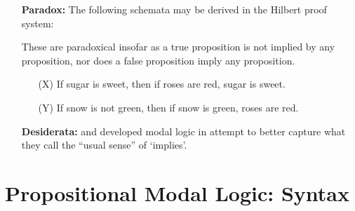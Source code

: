 \documentclass[a4paper, 11pt]{article} %
\begin{document}
\begin{enumerate}[leftmargin=1.2in]
	\item[\bf Paradox:] The following schemata may be derived in the Hilbert proof system:
	      \begin{itemize}\small
	      \end{itemize}
	      These are paradoxical insofar as a true proposition is not implied by any proposition, nor does a false proposition imply any proposition.
	      \begin{itemize}
		      \item[(X)] If sugar is sweet, then if roses are red, sugar is sweet.
          \item[(Y)] If snow is not green, then if snow is green, roses are red.
	      \end{itemize}
	\item[\bf Desiderata:] \citet{Lewis1912} and \citet{Lewis1932} developed modal logic in attempt to better capture what they call the ``usual sense'' of `implies'.
\end{enumerate}




\section*{\sc Propositional Modal Logic: Syntax}
\end{document}
